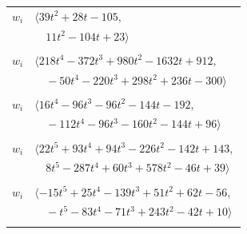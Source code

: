 \documentclass[11pt]{article}
\begin{document}
\begin{longtable}{@{}ll@{}}
$w_i$ & $\langle 39t^{2}+28t-105,$\\
 & $\quad 11t^{2}-104t+23\rangle$\\
\addlinespace[2pt]
\multicolumn{2}{@{}p{0.97\textwidth}@{}}{$i=12$, $D_i=1$, $\rho_{ij}$: $2{:}2, \allowbreak 5{:}3, \allowbreak 16{:}2, \allowbreak 18{:}1, \allowbreak 25{:}3, \allowbreak 31{:}1, \allowbreak 34{:}2, \allowbreak 35{:}2, \allowbreak 38{:}3, \allowbreak 41{:}2, \allowbreak 48{:}3, \allowbreak 49{:}3, \allowbreak 61{:}1, \allowbreak 63{:}1, \allowbreak 64{:}1, \allowbreak 66{:}2, \allowbreak 72{:}1, \allowbreak 77{:}1$}\\
$w_i$ & $\langle 218t^{4}-372t^{3}+980t^{2}-1632t+912,$\\
 & $\quad -50t^{4}-220t^{3}+298t^{2}+236t-300\rangle$\\
\addlinespace[2pt]
\multicolumn{2}{@{}p{0.97\textwidth}@{}}{$i=13$, $D_i=4$, $e_i=4$, $\rho_{ij}$: $0{:}2, \allowbreak 5{:}2, \allowbreak 19{:}2, \allowbreak 25{:}2, \allowbreak 41{:}2, \allowbreak 63{:}2, \allowbreak 69{:}2, \allowbreak 71{:}2$}\\
$w_i$ & $\langle 16t^{4}-96t^{3}-96t^{2}-144t-192,$\\
 & $\quad -112t^{4}-96t^{3}-160t^{2}-144t+96\rangle$\\
\addlinespace[2pt]
\multicolumn{2}{@{}p{0.97\textwidth}@{}}{$i=14$, $D_i=1$, $\rho_{ij}$: $1{:}3, \allowbreak 5{:}1, \allowbreak 6{:}3, \allowbreak 10{:}2, \allowbreak 11{:}1, \allowbreak 26{:}1, \allowbreak 35{:}3, \allowbreak 41{:}1, \allowbreak 45{:}1, \allowbreak 46{:}3, \allowbreak 52{:}3, \allowbreak 60{:}1, \allowbreak 64{:}1, \allowbreak 66{:}1, \allowbreak 69{:}3$}\\
$w_i$ & $\langle 22t^{5}+93t^{4}+94t^{3}-226t^{2}-142t+143,$\\
 & $\quad 8t^{5}-287t^{4}+60t^{3}+578t^{2}-46t+39\rangle$\\
\addlinespace[2pt]
\multicolumn{2}{@{}p{0.97\textwidth}@{}}{$i=15$, $D_i=1$, $\rho_{ij}$: $8{:}2, \allowbreak 10{:}3, \allowbreak 11{:}3, \allowbreak 24{:}1, \allowbreak 29{:}2, \allowbreak 30{:}2, \allowbreak 34{:}1, \allowbreak 45{:}3, \allowbreak 46{:}3, \allowbreak 53{:}2, \allowbreak 60{:}3, \allowbreak 62{:}1, \allowbreak 63{:}1, \allowbreak 65{:}2, \allowbreak 69{:}1, \allowbreak 73{:}3$}\\
$w_i$ & $\langle -15t^{5}+25t^{4}-139t^{3}+51t^{2}+62t-56,$\\
 & $\quad -t^{5}-83t^{4}-71t^{3}+243t^{2}-42t+10\rangle$\\
\addlinespace[2pt]
\multicolumn{2}{@{}p{0.97\textwidth}@{}}{$i=16$, $D_i=512$, $e_i=1$, $\rho_{ij}$: $0{:}2, \allowbreak 3{:}3, \allowbreak 4{:}1, \allowbreak 5{:}1, \allowbreak 9{:}1, \allowbreak 12{:}2, \allowbreak 20{:}3, \allowbreak 21{:}1, \allowbreak 23{:}3, \allowbreak 25{:}1, \allowbreak 36{:}3, \allowbreak 37{:}3, \allowbreak 49{:}3, \allowbreak 58{:}1, \allowbreak 59{:}2, \allowbreak 64{:}1, \allowbreak 65{:}3, \allowbreak 68{:}1, \allowbreak 69{:}3, \allowbreak 78{:}1, \allowbreak 79{:}3$}\\

\end{longtable}
\end{document}

